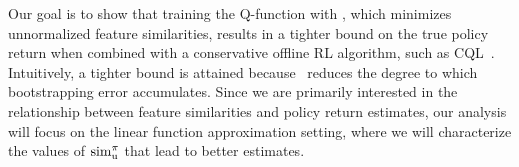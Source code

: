 Our goal is to show that training the Q-function with \methodname, which minimizes unnormalized feature similarities, results in a tighter bound on the true policy return when combined with a conservative offline RL algorithm, such as CQL~\citep{kumar2020conservative}. Intuitively, a tighter bound is attained because \methodname\ reduces the degree to which bootstrapping error accumulates. 
Since we are primarily interested in the relationship between feature similarities and policy return estimates,
our analysis will focus on the linear function approximation setting, where we will characterize the values of $\mathrm{sim}_{\mathrm{u}}^\pi$ that lead to better estimates.

